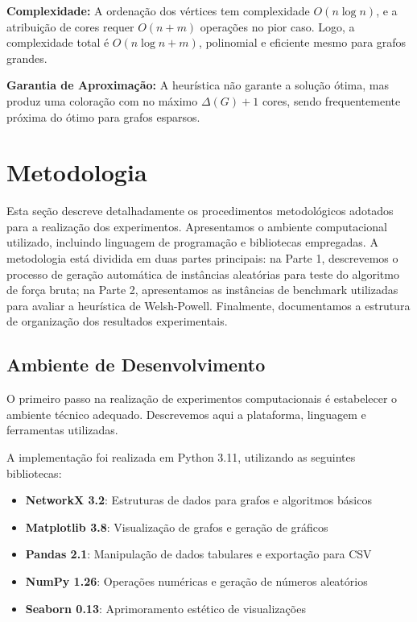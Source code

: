 \documentclass[12pt]{article}
\begin{document}
\textbf{Complexidade:} A ordenação dos vértices tem complexidade $O(n \log n)$, e a atribuição de cores requer $O(n + m)$ operações no pior caso. Logo, a complexidade total é $O(n \log n + m)$, polinomial e eficiente mesmo para grafos grandes.

\textbf{Garantia de Aproximação:} A heurística não garante a solução ótima, mas produz uma coloração com no máximo $\Delta(G) + 1$ cores, sendo frequentemente próxima do ótimo para grafos esparsos.

\newpage
\section{Metodologia}

Esta seção descreve detalhadamente os procedimentos metodológicos adotados para a realização dos experimentos. Apresentamos o ambiente computacional utilizado, incluindo linguagem de programação e bibliotecas empregadas. A metodologia está dividida em duas partes principais: na Parte 1, descrevemos o processo de geração automática de instâncias aleatórias para teste do algoritmo de força bruta; na Parte 2, apresentamos as instâncias de benchmark utilizadas para avaliar a heurística de Welsh-Powell. Finalmente, documentamos a estrutura de organização dos resultados experimentais.

\subsection{Ambiente de Desenvolvimento}

O primeiro passo na realização de experimentos computacionais é estabelecer o ambiente técnico adequado. Descrevemos aqui a plataforma, linguagem e ferramentas utilizadas.

A implementação foi realizada em Python 3.11, utilizando as seguintes bibliotecas:

\begin{itemize}
    \item \textbf{NetworkX 3.2}: Estruturas de dados para grafos e algoritmos básicos
    \item \textbf{Matplotlib 3.8}: Visualização de grafos e geração de gráficos
    \item \textbf{Pandas 2.1}: Manipulação de dados tabulares e exportação para CSV
    \item \textbf{NumPy 1.26}: Operações numéricas e geração de números aleatórios
    \item \textbf{Seaborn 0.13}: Aprimoramento estético de visualizações
\end{itemize}
\end{document}
